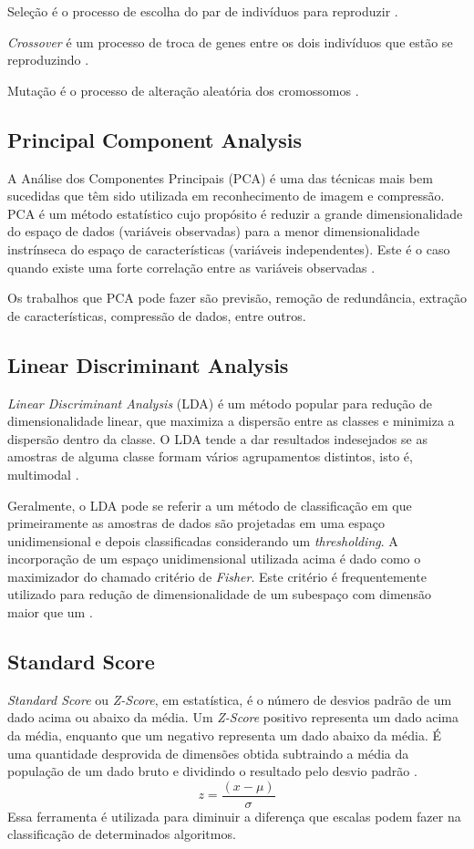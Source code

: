 \documentclass[conference]{IEEEtran}
\begin{document}
Seleção é o processo de escolha do par de indivíduos para reproduzir \cite{IEEEhowto:prebys}.

{\it Crossover} é um processo de troca de genes entre os dois indivíduos que estão se reproduzindo \cite{IEEEhowto:prebys}.

Mutação é o processo de alteração aleatória dos cromossomos \cite{IEEEhowto:prebys}.

\subsection{Principal Component Analysis}
A Análise dos Componentes Principais (PCA) é uma das técnicas mais bem sucedidas que têm sido utilizada em reconhecimento de imagem e compressão. PCA é um método estatístico cujo propósito é reduzir a grande dimensionalidade do espaço de dados (variáveis observadas) para a menor dimensionalidade instrínseca do espaço de características (variáveis independentes). Este é o caso quando existe uma forte correlação entre as variáveis observadas \cite{IEEEhowto:kim}.

Os trabalhos que PCA pode fazer são previsão, remoção de redundância, extração de características, compressão de dados, entre outros. \cite{IEEEhowto:kim}
\subsection{Linear Discriminant Analysis}
{\it Linear Discriminant Analysis} (LDA) \cite{IEEEhowto:fisher} \cite{IEEEhowto:fukunaga} é um método popular para redução de dimensionalidade linear, que maximiza a dispersão entre as classes e minimiza a dispersão dentro da classe. O LDA tende a dar resultados indesejados se as amostras de alguma classe formam vários agrupamentos distintos, isto é, multimodal \cite{IEEEhowto:fukunaga}. 

Geralmente, o LDA pode se referir a um método de classificação em que primeiramente as amostras de dados são projetadas em uma espaço unidimensional e depois classificadas considerando um {\it thresholding}. A incorporação de um espaço unidimensional utilizada acima é dado como o maximizador do chamado critério de {\it Fisher}. Este critério é frequentemente utilizado para redução de dimensionalidade de um subespaço com dimensão maior que um \cite{IEEEhowto:fukunaga}.
\subsection{Standard Score}
{\it Standard Score} ou {\it Z-Score}, em estatística, é o número de desvios padrão de um dado  acima ou abaixo da média. Um {\it Z-Score} positivo representa um dado acima da média, enquanto que um negativo representa um dado abaixo da média. É uma quantidade desprovida de dimensões obtida subtraindo a média da população de um dado bruto e dividindo o resultado pelo desvio padrão \cite{IEEEhowto:kreyszig}.
\begin{equation}
z=\frac{(x- \mu)}{\sigma} 
\end{equation}
Essa ferramenta é utilizada para diminuir a diferença que escalas podem fazer na classificação de determinados algoritmos.
\end{document}
